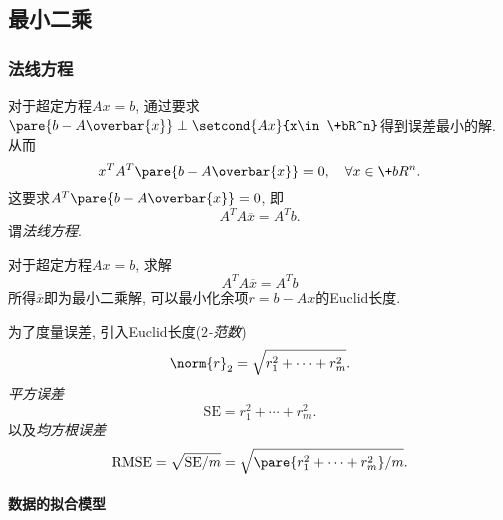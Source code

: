 \documentclass{ctexart}
\begin{document}


\subsection{最小二乘} %
\label{sub:最小二乘}

\subsubsection{法线方程} %
\label{ssub:法线方程}

对于超定方程$Ax = b$, 通过要求$\pare{b-A\overbar{x}}\perp \setcond{Ax}{x\in \+bR^n}$得到误差最小的解. 从而
\[ x^T A^T \pare{b-A\overbar{x}} = 0,\quad \forall x\in\+bR^n. \]
这要求$A^T\pare{b-A\overbar{x}} = 0$, 即
\[ A^TA\overbar{x} = A^T b. \]
谓\emph{法线方程}.
\begin{theorem}[最小二乘的法线方程]
    对于超定方程$Ax=b$, 求解
    \[ A^T A\overbar{x} = A^T b \]
    所得$\overbar{x}$即为最小二乘解, 可以最小化余项$r=b-Ax$的Euclid长度.
\end{theorem}
为了度量误差, 引入Euclid长度(\emph{$2$-范数})
\[ \norm{r}_2 = \sqrt{r_1^2+\cdots+r_m^2}. \]
\emph{平方误差}
\[ \mathrm{SE} = r_1^2 + \cdots + r_m^2. \]
以及\emph{均方根误差}
\[ \mathrm{RMSE} = \sqrt{\mathrm{SE}/m} = \sqrt{\pare{r_1^2 + \cdots + r_m^2}/m}. \]

\paragraph{数据的拟合模型} %
\label{par:数据的拟合模型}
\end{document}
